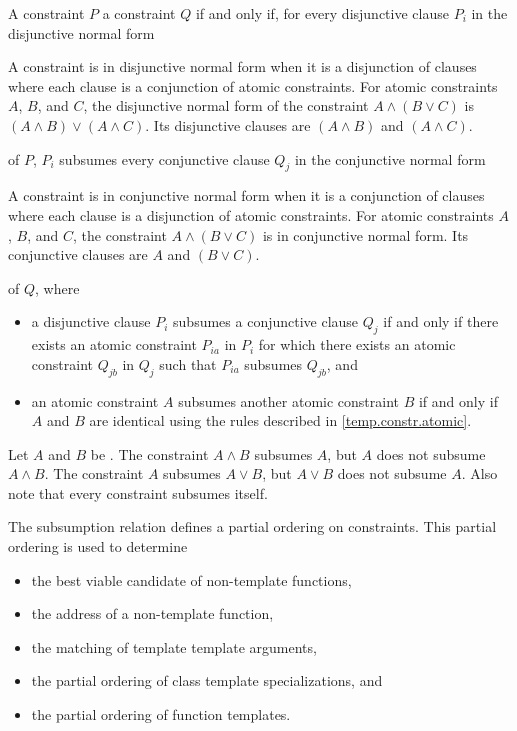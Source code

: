 \pnum
{}
A constraint $P$  a constraint $Q$
if and only if,
for every disjunctive clause $P_i$
in the disjunctive normal form
\begin{footnote}
A constraint is in disjunctive normal form when it is a disjunction of
clauses where each clause is a conjunction of atomic constraints.
For atomic constraints $A$, $B$, and $C$, the disjunctive normal form
of the constraint
$A \land (B \lor C)$
is
$(A \land B) \lor (A \land C)$.
%
Its disjunctive clauses are $(A \land B)$ and $(A \land C)$.
\end{footnote}
of $P$, $P_i$ subsumes every conjunctive clause $Q_j$
in the conjunctive normal form
\begin{footnote}
A constraint is in conjunctive normal form when it is a conjunction
of clauses where each clause is a disjunction of atomic constraints.
For atomic constraints $A$, $B$, and $C$, the constraint
$A \land (B \lor C)$ is in conjunctive normal form.
%
Its conjunctive clauses are $A$ and $(B \lor C)$.
\end{footnote}
of $Q$, where
\begin{itemize}
\item
a disjunctive clause $P_i$ subsumes a conjunctive clause $Q_j$ if and only
if there exists an atomic constraint $P_{ia}$ in $P_i$ for which there exists
an atomic constraint $Q_{jb}$ in $Q_j$ such that $P_{ia}$ subsumes $Q_{jb}$, and

\item an atomic constraint $A$ subsumes another atomic constraint
$B$ if and only if $A$ and $B$ are identical using the
rules described in \ref{temp.constr.atomic}.
\end{itemize}
%
\begin{example}
Let $A$ and $B$ be .
%
The constraint $A \land B$ subsumes $A$, but $A$ does not subsume $A \land B$.
%
The constraint $A$ subsumes $A \lor B$, but $A \lor B$ does not subsume $A$.
%
Also note that every constraint subsumes itself.
\end{example}

\pnum
\begin{note}
The subsumption relation defines a partial ordering on constraints.
This partial ordering is used to determine
\begin{itemize}
\item the best viable candidate of non-template functions,
\item the address of a non-template function,
\item the matching of template template arguments,
\item the partial ordering of class template specializations, and
\item the partial ordering of function templates.
\end{itemize}
\end{note}

